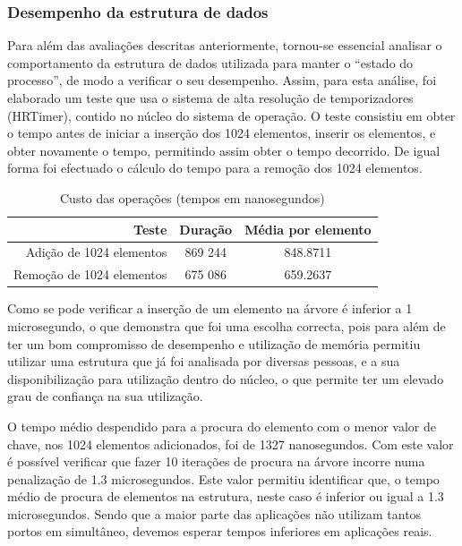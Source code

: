 \documentclass[a4paper]{llncs}
\begin{document}
\subsubsection{Desempenho da estrutura de dados}

Para além das avaliações descritas anteriormente, tornou-se essencial analisar o comportamento da estrutura de dados utilizada para manter o “estado do processo”, de modo a verificar o seu desempenho. 
Assim, para esta análise, foi elaborado um teste que usa o sistema de alta resolução de temporizadores (HRTimer), contido no núcleo do sistema de operação.
O teste consistiu em obter o tempo antes de iniciar a inserção dos 1024 elementos, inserir os elementos, e obter novamente o tempo, permitindo assim obter o tempo decorrido. De igual forma foi efectuado o cálculo do tempo para a remoção dos 1024 elementos.

\begin{table}
\begin{center}

\begin{tabular}{ | r | c | c | }
\hline
\hspace{1cm} Teste \hspace{1.5cm} & \hspace{1cm}Duração\hspace{1cm} &  Média por
elemento \\
\hline
Adição de 1024 elementos & 869 244 & 848.8711 \\
\hline
Remoção de 1024 elementos & 675 086 & 659.2637\\
\hline

\hline
\end{tabular}
\caption{Custo das operações (tempos em nanosegundos)}
\label{tab:tree_info}
\end{center}
\end{table}

Como se pode verificar a inserção de um elemento na árvore é inferior a 1 microsegundo, o que demonstra que foi uma escolha correcta, pois para além de ter um bom compromisso de desempenho e utilização de memória permitiu utilizar uma estrutura que já foi analisada por diversas pessoas, e a sua disponibilização para utilização dentro do núcleo, o que permite ter um elevado grau de confiança na sua utilização.

O tempo médio despendido para a procura do elemento com o menor valor de chave, nos 1024 elementos adicionados, foi de 1327 nanosegundos.
 Com este valor é possível verificar que fazer 10 iterações de procura na árvore incorre numa penalização de 1.3 microsegundos.
 Este valor permitiu identificar que, o tempo médio de procura de elementos na estrutura, neste caso é inferior ou igual a 1.3 microsegundos.
 Sendo que a maior parte das aplicações não utilizam tantos portos em simultâneo, devemos esperar tempos inferiores em aplicações reais.
\end{document}
